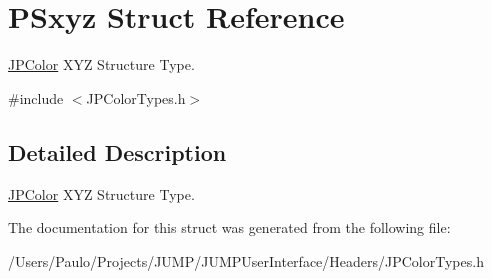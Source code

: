 \hypertarget{struct_p_sxyz}{
\section{PSxyz Struct Reference}
\label{struct_p_sxyz}
}


\hyperlink{interface_j_p_color}{JPColor} XYZ Structure Type.  




{\ttfamily \#include $<$JPColorTypes.h$>$}



\subsection{Detailed Description}
\hyperlink{interface_j_p_color}{JPColor} XYZ Structure Type. 

The documentation for this struct was generated from the following file:\begin{DoxyCompactItemize}
\item 
/Users/Paulo/Projects/JUMP/JUMPUserInterface/Headers/JPColorTypes.h\end{DoxyCompactItemize}
